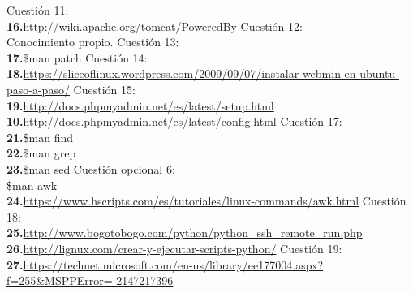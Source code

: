 \documentclass[a4paper, 11pt]{article} %
\begin{document}
\begin{thebibliography}{X}
  Cuestión 11:\\ 
 \textbf{16.}\url{http://wiki.apache.org/tomcat/PoweredBy}
   Cuestión 12:\\ 
 Conocimiento propio.
  Cuestión 13:\\ 
 \textbf{17.}\$man patch
  Cuestión 14:\\ 
 \textbf{18.}\url{https://sliceoflinux.wordpress.com/2009/09/07/instalar-webmin-en-ubuntu-paso-a-paso/}
  Cuestión 15:\\ 
 \textbf{19.}\url{http://docs.phpmyadmin.net/es/latest/setup.html}\\
 \textbf{10.}\url{http://docs.phpmyadmin.net/es/latest/config.html}
  Cuestión 17:\\ 
 \textbf{21.}\$man find\\
 \textbf{22.}\$man grep\\
 \textbf{23.}\$man sed
  Cuestión opcional 6:\\
 \$man awk\\
 \textbf{24.}\url{https://www.hscripts.com/es/tutoriales/linux-commands/awk.html}
  Cuestión 18:\\
 \textbf{25.}\url{http://www.bogotobogo.com/python/python_ssh_remote_run.php}\\
 \textbf{26.}\url{http://lignux.com/crear-y-ejecutar-scripts-python/}
  Cuestión 19:\\
 \textbf{27.}\url{https://technet.microsoft.com/en-us/library/ee177004.aspx?f=255&MSPPError=-2147217396}
 
 
\end{thebibliography}
\end{document}
